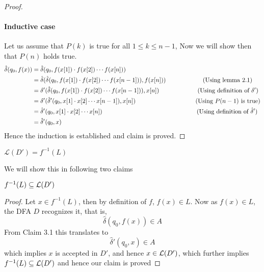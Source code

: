 \begin{soln}
\begin{proof}
		\paragraph{Inductive case} Let us assume that $P(k)$ is true for all $1 \leq k \leq n-1$, Now we will show then that $P(n)$ holds true.
		\begin{align*}
			\hat\delta(q_0,f(x)) & =\hat\delta(q_0,f(x[1])\cdot f(x[2]) \cdots f(x[n]) )                                                                                                                        \\
                                 & =\hat\delta( \hat\delta(q_0,f(x[1])\cdot f(x[2])\cdots f(x[n-1])), f(x[n]) ) \text{\hspace*{2cm} (Using lemma 2.1}) \\
			                     & = \delta'( \hat\delta(q_0,f(x[1])\cdot f(x[2])\cdots f(x[n-1])), x[n] ) \text{\hspace*{2.2cm}(Using definition of }\delta')                                                  \\
			                     & =  \delta' ( \hat \delta'(q_0,x[1]\cdot x[2] \cdots x[n-1]),x[n]) \text{    \hspace*{3.2cm}             (Using $P(n-1)$ is true)}                                            \\
                                 & = \hat\delta'(q_0,x[1] \cdot x[2] \cdots x[n])\hspace*{5.3cm} \text{ (Using definition of $\hd'$)}                                                                                                                              \\
			                     & = \hat\delta'(q_0,x)
		\end{align*}
		Hence the induction is established and claim is proved.
	\end{proof}
	\begin{claim}
		$\mathcal{L}(D') = f^{-1}(L)$
	\end{claim}
	We will show this in following two claims

	\begin{claim}
		$f^{-1}(L) \subseteq \mathcal{L}(D')$
	\end{claim}
	\begin{proof}
		Let $x \in f^{-1}(L)$, then by definition of $f$, $f(x) \in L$. Now as $f(x) \in L$, the DFA $D$ recognizes it, that is, 
		$$ \hat\delta(q_0,f(x)) \in A $$
		From Claim 3.1 this translates to
		$$ \hat\delta'(q_0,x) \in A $$
		which implies $x$ is accepted in $D'$, and hence $x \in \mathcal{L}(D')$, which further implies $f^{-1}(L) \subseteq \mathcal{L}(D')$ and hence our claim is proved
	\end{proof}


\end{soln}

